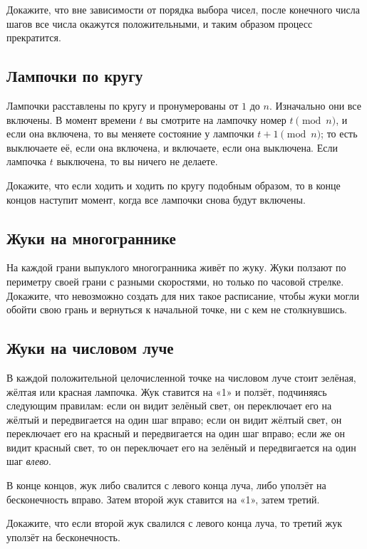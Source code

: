 Докажите, что вне зависимости от порядка выбора чисел, после конечного числа шагов все числа окажутся положительными, и таким образом процесс прекратится.

\subsection*{Лампочки по кругу}%

Лампочки расставлены по кругу и пронумерованы от $1$ до $n$.
Изначально они все включены.
В момент времени $t$ вы смотрите на лампочку номер $t \pmod{n}$, и если она включена, то вы меняете состояние у лампочки $t + 1 \pmod{n}$;
то есть выключаете её, если она включена, и включаете, если она выключена.
Если лампочка $t$ выключена, то вы ничего не делаете.

Докажите, что если ходить и ходить по кругу подобным образом, то в конце концов наступит момент, когда все лампочки снова будут включены.

\subsection*{Жуки на многограннике}%

На каждой грани выпуклого многогранника живёт по жуку.
Жуки ползают по периметру своей грани с разными скоростями, но только по часовой стрелке.
Докажите, что невозможно создать для них такое расписание, чтобы жуки могли обойти свою грань и вернуться к начальной точке, ни с кем не столкнувшись.

\subsection*{Жуки на числовом луче}%

В каждой положительной целочисленной точке на числовом луче стоит зелёная, жёлтая или красная лампочка.
Жук ставится на «1» и ползёт, подчиняясь следующим правилам:
если он видит зелёный свет, он переключает его на жёлтый и передвигается на один шаг вправо; 
если он видит жёлтый свет, он переключает его на красный и передвигается на один шаг вправо; 
если же он видит красный свет, то он переключает его на зелёный и передвигается на один шаг \emph{влево}.

В конце концов, жук либо свалится с левого конца луча, либо уползёт на бесконечность вправо.
Затем второй жук ставится на «1», затем третий.

Докажите, что если второй жук свалился с левого конца луча, то третий жук уползёт на бесконечность.

